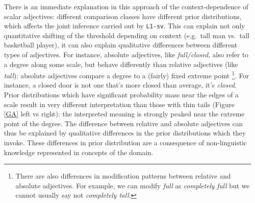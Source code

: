 \documentclass[12pt]{article}
\begin{document}
There is an immediate explanation in this approach of the context-dependence of scalar adjectives: different comparison classes have different prior distributions, which affects the joint inference carried out by \lstinline{L1-sv}. This can explain not only quantitative shifting of the threshold depending on context (e.g.~tall man vs.~tall basketball player), it can also explain qualitative differences between different types of adjectives. For instance, absolute adjectives, like \emph{full/closed}, also refer to a degree along some scale, but behave differently than relative adjectives (like \emph{tall}): absolute adjectives compare a degree to a (fairly) fixed extreme point \cite{rotsteinwinter04,kennedymcnally05,kennedy07}\footnote{There are also differences in modification patterns between relative and absolute adjectives. For example, we can modify \emph{full} as \emph{completely full} but we cannot usually say not \emph{completely tall}.}. 
For instance, a closed door is not one that's more closed than average, it's \emph{closed}.
%
%
Prior distributions which have significant probability mass near the edges of a scale result in very different interpretation than those with thin tails (Figure \ref{GA} left vs right): the interpreted meaning is strongly peaked near the extreme point of the degree. The difference between relative and absolute adjectives can thus be explained by qualitative differences in the prior distributions which they invoke. These differences in prior distribution are a consequence of non-linguistic knowledge represented in concepts of the domain.
\end{document}
